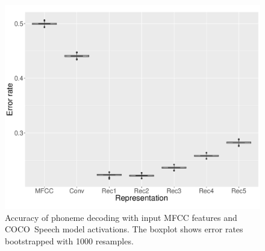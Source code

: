 \begin{figure}[t]
  \centering
  \includegraphics[scale=0.3]{figures/decode.pdf}
     \caption{Accuracy of phoneme decoding with input MFCC features
       and COCO~Speech model activations. The boxplot shows error rates
       bootstrapped with 1000 resamples.}
     \label{fig:decode}
\end{figure}

